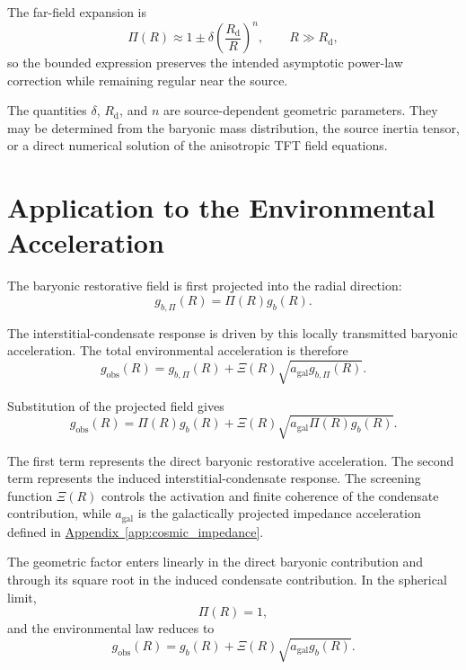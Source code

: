 The far-field expansion is
\begin{equation}
    \Pi(R) \approx 1 \pm \delta \left( \frac{R_{\mathrm{d}}}{R} \right)^n, \qquad R \gg R_{\mathrm{d}},
\end{equation}
so the bounded expression preserves the intended asymptotic power-law correction while remaining regular near the source.

The quantities $\delta$, $R_{\mathrm{d}}$, and $n$ are source-dependent geometric parameters. They may be determined from the baryonic mass distribution, the source inertia tensor, or a direct numerical solution of the anisotropic TFT field equations.

\section{Application to the Environmental Acceleration}

The baryonic restorative field is first projected into the radial direction:
\begin{equation}
    g_{b,\Pi}(R) = \Pi(R)g_b(R).
\end{equation}

The interstitial-condensate response is driven by this locally transmitted baryonic acceleration. The total environmental acceleration is therefore
\begin{equation}
    g_{\mathrm{obs}}(R) = g_{b,\Pi}(R) + \Xi(R) \sqrt{ a_{\mathrm{gal}}g_{b,\Pi}(R) }.
\end{equation}

Substitution of the projected field gives
\begin{equation}
    g_{\mathrm{obs}}(R) = \Pi(R)g_b(R) + \Xi(R) \sqrt{ a_{\mathrm{gal}}\Pi(R)g_b(R) }.
\end{equation}

The first term represents the direct baryonic restorative acceleration. The second term represents the induced interstitial-condensate response. The screening function $\Xi(R)$ controls the activation and finite coherence of the condensate contribution, while $a_{\mathrm{gal}}$ is the galactically projected impedance acceleration defined in \hyperref[app:cosmic_impedance]{Appendix~\ref*{app:cosmic_impedance}}.

The geometric factor enters linearly in the direct baryonic contribution and through its square root in the induced condensate contribution. In the spherical limit,
\begin{equation}
    \Pi(R) = 1,
\end{equation}
and the environmental law reduces to
\begin{equation}
    g_{\mathrm{obs}}(R) = g_b(R) + \Xi(R) \sqrt{ a_{\mathrm{gal}}g_b(R) }.
\end{equation}

